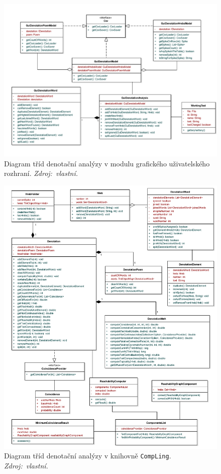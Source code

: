 \documentclass[dp.tex]{subfiles}
\begin{document}
\begin{figure}[H]
	\centering
	\includegraphics[max width=\textwidth,keepaspectratio=true]{imgs-60-aplikace/gui-denotation-class-diagram}
	\caption[]{Diagram tříd denotační analýzy v modulu grafického uživatelského rozhraní. \textit{Zdroj:~vlastní.}}
	\label{fig:gui-denotation-class-diagram}
\end{figure}
\newpage
\begin{figure}[H]
	\centering
	\includegraphics[max width=\textwidth,keepaspectratio=true]{imgs-60-aplikace/compLing-denotation-class-diagram}
	\caption[]{Diagram tříd denotační analýzy v knihovně \texttt{CompLing}. \textit{Zdroj:~vlastní.}}
	\label{fig:compling-denotation-class-diagram}
\end{figure}
\end{document}
